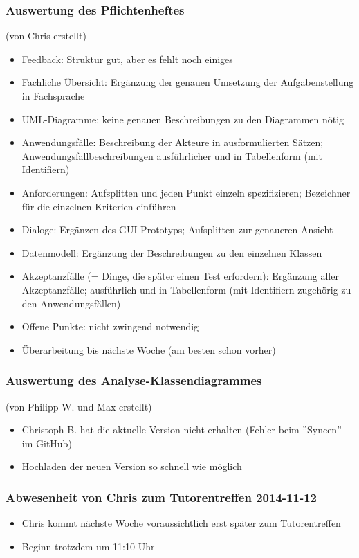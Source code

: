 \documentclass[12pt,a4paper]{article}
\begin{document}
\subsubsection*{Auswertung des Pflichtenheftes}
(von Chris erstellt)
\begin{itemize}
\item Feedback: Struktur gut, aber es fehlt noch einiges
\item Fachliche Übersicht: Ergänzung der genauen Umsetzung der Aufgabenstellung in Fachsprache
\item UML-Diagramme: keine genauen Beschreibungen zu den Diagrammen nötig
\item Anwendungsfälle: Beschreibung der Akteure in ausformulierten Sätzen; Anwendungsfallbeschreibungen ausführlicher und in Tabellenform (mit Identifiern)
\item Anforderungen: Aufsplitten und jeden Punkt einzeln spezifizieren; Bezeichner für die einzelnen Kriterien einführen
\item Dialoge: Ergänzen des GUI-Prototyps; Aufsplitten zur genaueren Ansicht
\item Datenmodell: Ergänzung der Beschreibungen zu den einzelnen Klassen
\item Akzeptanzfälle (= Dinge, die später einen Test erfordern): Ergänzung aller Akzeptanzfälle; ausführlich und in Tabellenform (mit Identifiern zugehörig zu den Anwendungsfällen)
\item Offene Punkte: nicht zwingend notwendig
\item Überarbeitung bis nächste Woche (am besten schon vorher)
\end{itemize}

\subsubsection*{Auswertung des Analyse-Klassendiagrammes}
(von Philipp W. und Max erstellt)
\begin{itemize}
\item Christoph B. hat die aktuelle Version nicht erhalten (Fehler beim ''Syncen'' im GitHub)
\item Hochladen der neuen Version so schnell wie möglich
\end{itemize}

\subsubsection*{Abwesenheit von Chris zum Tutorentreffen 2014-11-12}
\begin{itemize}
\item Chris kommt nächste Woche voraussichtlich erst später zum Tutorentreffen
\item Beginn trotzdem um 11:10 Uhr
\end{itemize}
\end{document}

